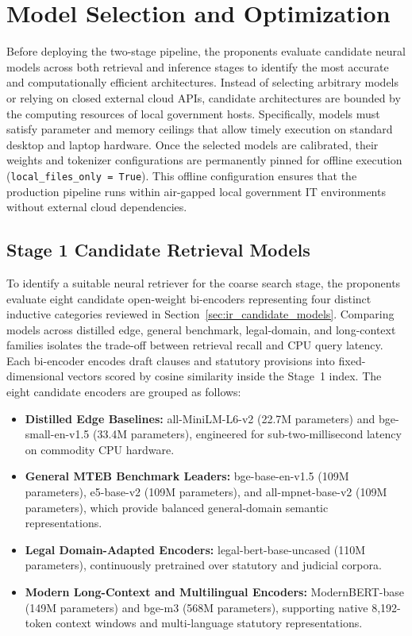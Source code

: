     \section{Model Selection and Optimization}
    \label{sec:model_selection}
    Before deploying the two-stage pipeline, the proponents evaluate candidate neural models across both retrieval and inference stages to identify the most accurate and computationally efficient architectures. Instead of selecting arbitrary models or relying on closed external cloud APIs, candidate architectures are bounded by the computing resources of local government hosts. Specifically, models must satisfy parameter and memory ceilings that allow timely execution on standard desktop and laptop hardware. Once the selected models are calibrated, their weights and tokenizer configurations are permanently pinned for offline execution (\texttt{local\_files\_only = True}). This offline configuration ensures that the production pipeline runs within air-gapped local government IT environments without external cloud dependencies.

    \subsection{Stage 1 Candidate Retrieval Models}
    \label{sec:stage1_dense_pool}
    To identify a suitable neural retriever for the coarse search stage, the proponents evaluate eight candidate open-weight bi-encoders representing four distinct inductive categories reviewed in Section~\ref{sec:ir_candidate_models}. Comparing models across distilled edge, general benchmark, legal-domain, and long-context families isolates the trade-off between retrieval recall and CPU query latency. Each bi-encoder encodes draft clauses and statutory provisions into fixed-dimensional vectors scored by cosine similarity inside the Stage~1 index. The eight candidate encoders are grouped as follows:
    \begin{itemize}\sloppy
        \item \textbf{Distilled Edge Baselines:} all-MiniLM-L6-v2 (22.7M parameters) and bge-small-en-v1.5 (33.4M parameters), engineered for sub-two-millisecond latency on commodity CPU hardware.
        \item \textbf{General MTEB Benchmark Leaders:} bge-base-en-v1.5 (109M parameters), e5-base-v2 (109M parameters), and all-mpnet-base-v2 (109M parameters), which provide balanced general-domain semantic representations.
        \item \textbf{Legal Domain-Adapted Encoders:} legal-bert-base-uncased (110M parameters), continuously pretrained over statutory and judicial corpora.
        \item \textbf{Modern Long-Context and Multilingual Encoders:} ModernBERT-base (149M parameters) and bge-m3 (568M parameters), supporting native 8,192-token context windows and multi-language statutory representations.
    \end{itemize}

